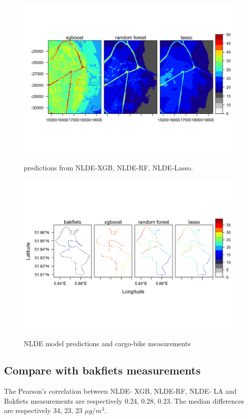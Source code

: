 \documentclass{article}
\begin{document}
\begin{figure}[H]
    \includegraphics[width=\linewidth]{NLDE.png}
    \label{nldepred}
    \caption {predictions from NLDE-XGB, NLDE-RF, NLDE-Lasso.}
\end{figure}
\begin{figure}[H]
    \includegraphics [scale = 0.3 ]{NLDEtrack.png}
    \label{nldevsbak}
    \caption { NLDE model predictions and cargo-bike measurements}
\end{figure}

\subsection{Compare with bakfiets measurements}
The Pearson's correlation between NLDE- XGB, NLDE-RF, NLDE- LA  and Bakfiets measurements are respectively 0.24, 0.28, 0.23. The median differences are respectively 34, 23, 23 $\mu g/m^3$. 
\end{document}
